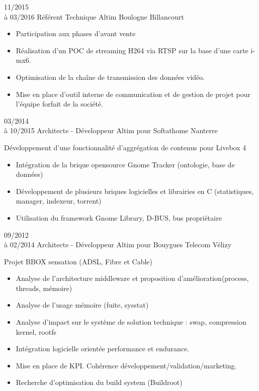 \documentclass[10pt,a4paper]{moderncv}       %
\begin{document}
\vspace*{3mm}
\cventry
{11/2015\\à 03/2016}   %
{Référent Technique}   %
{Altim}                %
{Boulogne Billancourt} %
{}                     %
{
\begin{itemize}
\setlength{\itemindent}{2mm}
  \item Participation aux phases d'avant vente
  \item Réalisation d'un POC de streaming H264 via RTSP sur la base d'une carte
  i-mx6.
  \item Optimisation de la chaîne de transmission des données vidéo.
  \item Mise en place d'outil interne de communication et de gestion de projet
  pour l'équipe forfait de la société.
\end{itemize}
}
\vspace*{3mm}
\cventry
{03/2014\\à 10/2015}       %
{Architecte - Développeur} %
{Altim pour Softathome}    %
{Nanterre}                 %
{}                         %
{
Développement d’une fonctionnalité d’aggrégation de contenus pour Livebox 4
\begin{itemize}
\setlength{\itemindent}{2mm}
  \item  Intégration de la brique opensource Gnome Tracker (ontologie, base de
données)
  \item Développement de plusieurs briques logicielles et librairies en C
 (statistiques, manager, indexeur, torrent)
  \item Utilisation du framework Gnome Library, D-BUS, bus propriétaire
\end{itemize}
}
\vspace*{3mm}
\cventry
{09/2012\\à 02/2014}          %
{Architecte - Développeur}    %
{Altim pour Bouygues Telecom} %
{Vélizy}                      %
{}                            %
{Projet BBOX sensation (ADSL, Fibre et Cable)
\begin{itemize}
\setlength{\itemindent}{2mm}
  \item Analyse de l’architecture middleware et proposition d’amélioration(process, threads, mémoire)
  \item Analyse de l’usage mémoire (fuite, sysstat)
  \item Analyse d’impact sur le système de solution technique : swap, compression kernel, rootfs
  \item Intégration logicielle orientée performance et endurance.
  \item Mise en place de KPI. Cohérence développement/validation/marketing.
  \item Recherche d’optimisation du build system (Buildroot)
\end{itemize}
}
\end{document}
